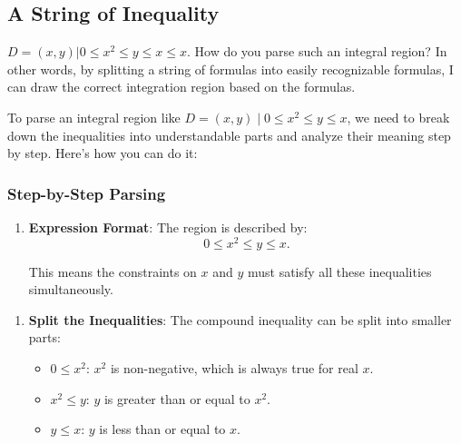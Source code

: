 \documentclass[a4paper,12pt]{book}
\begin{document}
\subsection{A String of Inequality}

\(D={ (x,y) | 0 \leq x^2 \leq y \leq x \leq x  }\). How do you parse such an integral region? In other words, by splitting a string of formulas into easily recognizable formulas, I can draw the correct integration region based on the formulas.

To parse an integral region like \( D = { (x, y) \mid 0 \leq x^2 \leq y \leq x } \), we need to break down the inequalities into understandable parts and analyze their meaning step by step. Here’s how you can do it:

\hrulefill

\subsubsection{Step-by-Step Parsing}
\begin{enumerate}
\item 
\textbf{Expression Format}:
The region is described by:
\[
0 \leq x^2 \leq y \leq x.
\]

This means the constraints on \(x\) and \(y\) must satisfy all these inequalities simultaneously.

\end{enumerate}

\hrulefill
\begin{enumerate}
\item 
\textbf{Split the Inequalities}:
The compound inequality can be split into smaller parts:
\begin{itemize}
\item 
\(0 \leq x^2\): \(x^2\) is non-negative, which is always true for real \(x\).

\item 
\(x^2 \leq y\): \(y\) is greater than or equal to \(x^2\).

\item 
\(y \leq x\): \(y\) is less than or equal to \(x\).

\end{itemize}

\end{enumerate}
\end{document}
